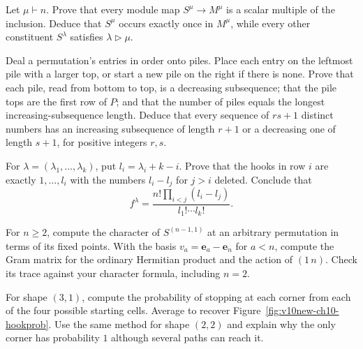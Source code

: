 \begin{exercise}[$\star\star$]\label{ex:youngmult}
Let $\mu\vdash n$. Prove that every module map $S^\mu\to M^\mu$ is a scalar multiple of the inclusion. Deduce that $S^\mu$ occurs exactly once in $M^\mu$, while every other constituent $S^\lambda$ satisfies $\lambda\triangleright\mu$.
\end{exercise}

\begin{exercise}[$\star\star$]\label{ex:patience}
Deal a permutation's entries in order onto piles. Place each entry on the leftmost pile with a larger top, or start a new pile on the right if there is none. Prove that each pile, read from bottom to top, is a decreasing subsequence; that the pile tops are the first row of $P$; and that the number of piles equals the longest increasing-subsequence length. Deduce that every sequence of $rs+1$ distinct numbers has an increasing subsequence of length $r+1$ or a decreasing one of length $s+1$, for positive integers $r,s$.
\end{exercise}

\begin{exercise}[$\star\star\star$]\label{ex:frobeniusdim}
For $\lambda=(\lambda_1,\ldots,\lambda_k)$, put $l_i=\lambda_i+k-i$. Prove that the hooks in row $i$ are exactly $1,\ldots,l_i$ with the numbers $l_i-l_j$ for $j>i$ deleted. Conclude that
\[
f^\lambda=\frac{n!\prod_{i<j}(l_i-l_j)}{l_1!\cdots l_k!}.
\]
\end{exercise}

\begin{exercise}[$\star\star$]\label{ex:v10new-ch10-standardcharacter}
For $n\ge2$, compute the character of $S^{(n-1,1)}$ at an arbitrary permutation in terms of its fixed points. With the basis $v_a=\mathbf e_a-\mathbf e_n$ for $a<n$, compute the Gram matrix for the ordinary Hermitian product and the action of $(1\,n)$. Check its trace against your character formula, including $n=2$.
\end{exercise}

\begin{exercise}[$\star\star$]\label{ex:v10new-ch10-hookwalk}
For shape $(3,1)$, compute the probability of stopping at each corner from each of the four possible starting cells. Average to recover Figure~\ref{fig:v10new-ch10-hookprob}. Use the same method for shape $(2,2)$ and explain why the only corner has probability $1$ although several paths can reach it.
\end{exercise}


